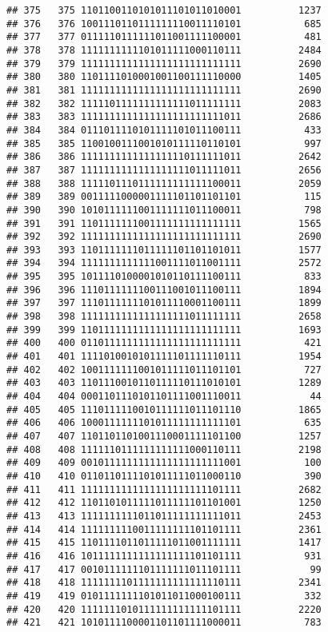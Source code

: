 \documentclass[]{article}
\begin{document}
\begin{verbatim}
## 375   375 1101100110101011101011010001          1237
## 376   376 1001110110111111110011110101           685
## 377   377 0111110111111011001111100001           481
## 378   378 1111111111101011111000110111          2484
## 379   379 1111111111111111111111111111          2690
## 380   380 1101111010001001100111110000          1405
## 381   381 1111111111111111111111111111          2690
## 382   382 1111101111111111111011111111          2083
## 383   383 1111111111111111111111111011          2686
## 384   384 0111011110101111101011100111           433
## 385   385 1100100111001010111110110101           997
## 386   386 1111111111111111110111111011          2642
## 387   387 1111111111111111111011111011          2656
## 388   388 1111101110111111111111100011          2059
## 389   389 0011111000001111101101101101           115
## 390   390 1010111111001111111011100011           798
## 391   391 1101111111001111111111111111          1565
## 392   392 1111111111111111111111111111          2690
## 393   393 1101111111011111101101101011          1577
## 394   394 1111111111111001111011001111          2572
## 395   395 1011110100001010110111100111           833
## 396   396 1110111111100111001011100111          1894
## 397   397 1110111111101011110001100111          1899
## 398   398 1111111111111111111011111111          2658
## 399   399 1101111111111111111111111111          1693
## 400   400 0110111111111111111111111111           421
## 401   401 1111010010101111101111110111          1954
## 402   402 1001111111001011111011101101           727
## 403   403 1101110010110111110111010101          1289
## 404   404 0001101110101101111001110011            44
## 405   405 1110111110010111111011101110          1865
## 406   406 1000111111101011111111111101           635
## 407   407 1101101101001110001111101100          1257
## 408   408 1111110111111111111000110111          2198
## 409   409 0010111111111111111111111001           100
## 410   410 0110110111101011111011000110           390
## 411   411 1111111111111111111111101111          2682
## 412   412 1101101011111011111101101001          1250
## 413   413 1111111111011011111111111011          2453
## 414   414 1111111110011111111101101111          2361
## 415   415 1101111011011111011001111111          1417
## 416   416 1011111111111111111101101111           931
## 417   417 0010111111101111111011101111            99
## 418   418 1111111101111111111111110111          2341
## 419   419 0101111111101011011000100111           332
## 420   420 1111111010111111111111101111          2220
## 421   421 1010111100001101101111000011           783

\end{verbatim}
\end{document}
